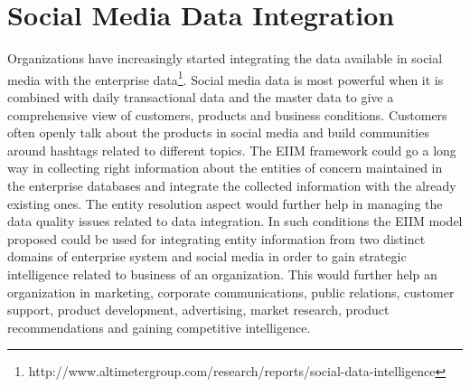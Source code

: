 \section{Social Media Data Integration}
Organizations have increasingly started integrating the data available in social media with the enterprise data\footnote{http://www.altimetergroup.com/research/reports/social-data-intelligence}. Social media data is most powerful when it is combined with daily transactional data and the master data to give a comprehensive view of customers, products and business conditions. Customers often openly talk about the products in social media and build communities around hashtags \cite{tsur2012s} related to different topics. The EIIM framework could go a long way in collecting right information about the entities of concern maintained in the enterprise databases and integrate the collected information with the already existing ones. The entity resolution aspect would further help in managing the data quality issues related to data integration. In such conditions the EIIM model proposed could be used for integrating entity information from two distinct domains of enterprise system and social media in order to gain strategic intelligence related to business of an organization. This would further help an organization in marketing, corporate communications, public relations, customer support, product development, advertising, market research, product recommendations and gaining competitive intelligence.

